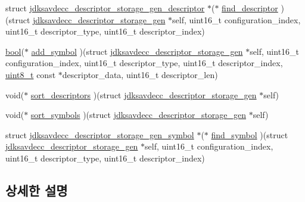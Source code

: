 \begin{DoxyCompactItemize}
\item 
struct \hyperlink{structjdksavdecc__descriptor__storage__gen__descriptor}{jdksavdecc\+\_\+descriptor\+\_\+storage\+\_\+gen\+\_\+descriptor} $\ast$($\ast$ \hyperlink{structjdksavdecc__descriptor__storage__gen_a2271ec05cf2e18cbea4645e73d8fda34}{find\+\_\+descriptor} )(struct \hyperlink{structjdksavdecc__descriptor__storage__gen}{jdksavdecc\+\_\+descriptor\+\_\+storage\+\_\+gen} $\ast$self, uint16\+\_\+t configuration\+\_\+index, uint16\+\_\+t descriptor\+\_\+type, uint16\+\_\+t descriptor\+\_\+index)
\item 
\hyperlink{avb__gptp_8h_af6a258d8f3ee5206d682d799316314b1}{bool}($\ast$ \hyperlink{structjdksavdecc__descriptor__storage__gen_a54d2a7579bd9402aa4b55e46ae3c589a}{add\+\_\+symbol} )(struct \hyperlink{structjdksavdecc__descriptor__storage__gen}{jdksavdecc\+\_\+descriptor\+\_\+storage\+\_\+gen} $\ast$self, uint16\+\_\+t configuration\+\_\+index, uint16\+\_\+t descriptor\+\_\+type, uint16\+\_\+t descriptor\+\_\+index, \hyperlink{stdint_8h_aba7bc1797add20fe3efdf37ced1182c5}{uint8\+\_\+t} const $\ast$descriptor\+\_\+data, uint16\+\_\+t descriptor\+\_\+len)
\item 
void($\ast$ \hyperlink{structjdksavdecc__descriptor__storage__gen_a68d99b15ec94039ed0e21b6b8c55b19e}{sort\+\_\+descriptors} )(struct \hyperlink{structjdksavdecc__descriptor__storage__gen}{jdksavdecc\+\_\+descriptor\+\_\+storage\+\_\+gen} $\ast$self)
\item 
void($\ast$ \hyperlink{structjdksavdecc__descriptor__storage__gen_a88273f7f9ae49432dc1ee1a3bacc5273}{sort\+\_\+symbols} )(struct \hyperlink{structjdksavdecc__descriptor__storage__gen}{jdksavdecc\+\_\+descriptor\+\_\+storage\+\_\+gen} $\ast$self)
\item 
struct \hyperlink{structjdksavdecc__descriptor__storage__gen__symbol}{jdksavdecc\+\_\+descriptor\+\_\+storage\+\_\+gen\+\_\+symbol} $\ast$($\ast$ \hyperlink{structjdksavdecc__descriptor__storage__gen_a3b00a9c203cc12ca51532823854d850f}{find\+\_\+symbol} )(struct \hyperlink{structjdksavdecc__descriptor__storage__gen}{jdksavdecc\+\_\+descriptor\+\_\+storage\+\_\+gen} $\ast$self, uint16\+\_\+t configuration\+\_\+index, uint16\+\_\+t descriptor\+\_\+type, uint16\+\_\+t descriptor\+\_\+index)
\end{DoxyCompactItemize}


\subsection{상세한 설명}



